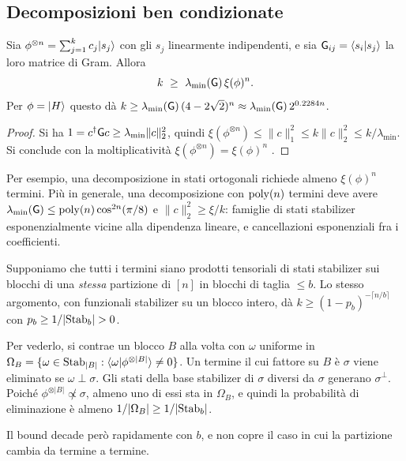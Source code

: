 \subsection{Decomposizioni ben condizionate}

\begin{proposition}\label{prop:cond-number}
Sia $\phi^{\otimes n}=\sum_{j=1}^kc_j\lvert s_j\rangle$ con gli $s_j$ linearmente indipendenti, e sia $\mathsf G_{ij}=\langle s_i\vert s_j\rangle$ la loro matrice di Gram. Allora
\[
k\ \ge\ \lambda_{\min}(\Gram)\,\xi(\phi)^n .
\]
Per $\phi=\lvert H\rangle$ questo dà $k\ge\lambda_{\min}(\mathsf G)\,(4-2\sqrt2)^n\approx\lambda_{\min}(\mathsf G)\,2^{0.2284n}$.
\end{proposition}

\begin{proof}
Si ha $1=c^\dagger\mathsf G c\ge\lambda_{\min}\|c\|_2^2$, quindi $\xi(\phi^{\otimes n})\le\|c\|_1^2\le k\|c\|_2^2\le k/\lambda_{\min}$. Si conclude con la moltiplicatività $\xi(\phi^{\otimes n})=\xi(\phi)^n$ \cite{BBCCGH19}.
\end{proof}

\noindent Per esempio, una decomposizione in stati ortogonali richiede almeno $\xi(\phi)^n$ termini. Più in generale, una decomposizione con $\mathrm{poly}(n)$ termini deve avere $\lambda_{\min}(\mathsf G)\le\mathrm{poly}(n)\cos^{2n}(\pi/8)$ e $\|c\|_2^2\ge\xi/k$: famiglie di stati stabilizer esponenzialmente vicine alla dipendenza lineare, e cancellazioni esponenziali fra i coefficienti.

\begin{remark}\label{rem:blocks}
Supponiamo che tutti i termini siano prodotti tensoriali di stati stabilizer sui blocchi di una \emph{stessa} partizione di $[n]$ in blocchi di taglia $\le b$. Lo stesso argomento, con funzionali stabilizer su un blocco intero, dà $k\ge(1-p_b)^{-\lceil n/b\rceil}$ con $p_b\ge1/|\Stab_b|>0$.

Per vederlo, si contrae un blocco $B$ alla volta con $\omega$ uniforme in $\Omega_B=\{\omega\in\mathrm{Stab}_{|B|}:\langle \omega\vert \phi^{\otimes|B|}\rangle\neq0\}$. Un termine il cui fattore su $B$ è $\sigma$ viene eliminato se $\omega\perp\sigma$. Gli stati della base stabilizer di $\sigma$ diversi da $\sigma$ generano $\sigma^\perp$. Poiché $\phi^{\otimes|B|}\not\propto\sigma$, almeno uno di essi sta in $\Omega_B$, e quindi la probabilità di eliminazione è almeno $1/|\Omega_B|\ge1/|\mathrm{Stab}_b|$.

Il bound decade però rapidamente con $b$, e non copre il caso in cui la partizione cambia da termine a termine.
\end{remark}



